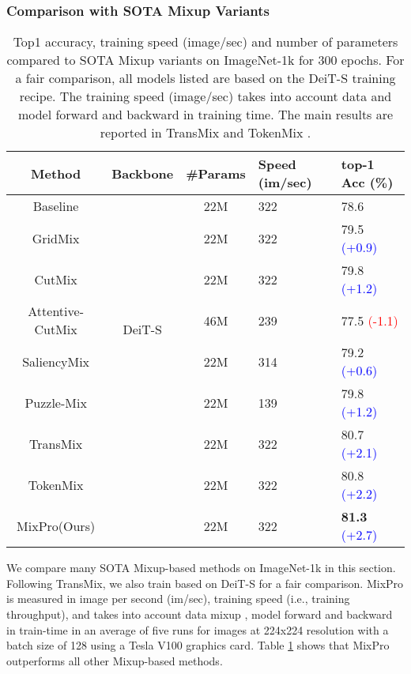 \documentclass{article} \usepackage{iclr2023_conference,times}
\begin{document}
\subsubsection{Comparison with SOTA Mixup Variants}
\begin{table}[!htb]
\caption{Top1 accuracy, training speed (image/sec) and number of parameters compared to SOTA Mixup variants on ImageNet-1k for 300 epochs. For a fair comparison, all models listed are based on the DeiT-S training recipe. The training speed (image/sec) takes into account data and model forward and backward in training time. The main results are reported in TransMix \citep{chen2021transmix} and TokenMix \citep{liu2022tokenmix}. }
\label{tabmixup}
	\centering
	\begin{tabular}{c|ccp{1cm}p{2cm}}
    \toprule
    Method     & Backbone   & \#Params & Speed (im/sec) & top-1 Acc (\%) \\
    \midrule
    Baseline & \multirow{7}{*}{DeiT-S }   & 22M & 322 & 78.6     \\
    GridMix     &  ~ & 22M & 322 & 79.5 \textcolor{blue}{(+0.9)}    \\
    CutMix     &  ~ & 22M & 322 & 79.8 \textcolor{blue}{(+1.2)}    \\
    Attentive-CutMix    & ~ & 46M & 239 & 77.5 \textcolor{red}{(-1.1)}     \\
    SaliencyMix     & ~  & 22M & 314 & 79.2    \textcolor{blue}{(+0.6)}  \\
    Puzzle-Mix  &  ~  & 22M &  139 &  79.8   \textcolor{blue}{(+1.2)}   \\
    TransMix    & ~  & 22M & 322 & 80.7    \textcolor{blue}{(+2.1)}  \\
    TokenMix    & ~  & 22M & 322 & 80.8    \textcolor{blue}{(+2.2)}  \\
    \midrule
MixPro(Ours)     & ~ & 22M & 322 & \textbf{81.3}    \textcolor{blue}{(+2.7)}  \\
    \bottomrule
    
\end{tabular}
\vspace{-10px}
\end{table}

We compare many SOTA Mixup-based methods on ImageNet-1k \citep{deng2009imagenet} in this section. Following TransMix, we also train based on DeiT-S for a fair comparison. MixPro is measured in image per second (im/sec), training speed (i.e., training throughput), and takes into account data mixup \citep{zhang2017mixup}, model forward and backward in train-time in an average of five runs for images at 224x224 resolution with a batch size of 128 using a Tesla V100 graphics card. Table \ref{tabmixup} shows that MixPro outperforms all other Mixup-based methods.
\end{document}
